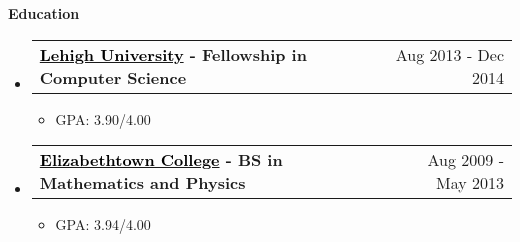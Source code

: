 \documentclass[letterpaper,12pt]{article}
\makeatletter
\newcommand{\link}[2]{\href{#1}{\textcolor{black}{#2}}}
\newcommand{\resitem}[1]{\item #1 \vspace{-2pt}}
\newcommand{\resheading}[1]{{\large \colorbox{mygrey}{\begin{minipage}{\textwidth}{\textbf{\sc #1 \vphantom{p\^{E}}}}\end{minipage}}}}
\newcommand{\miniheading}[2]{
	\begin{tabular*}{6.5in}{l@{\extracolsep{\fill}}r}
			\textbf{#1} & #2 \\
	\end{tabular*}\vspace{-6pt}
}
\makeatother
\begin{document}
\resheading{Education}
	\begin{itemize}
        \item \miniheading
            {\link{http://www.cse.lehigh.edu/}{Lehigh University} - Fellowship in Computer Science}
            {Aug 2013 - Dec 2014}
                \begin{itemize}
                    \resitem{GPA: 3.90/4.00}
                \end{itemize}
        \item \miniheading
            {\link{http://www.etown.edu}{Elizabethtown College} - BS in Mathematics and Physics}
            {Aug 2009 - May 2013}
                \begin{itemize}
                    \resitem{GPA: 3.94/4.00}
                \end{itemize}	
	\end{itemize} %
    
\end{document}
